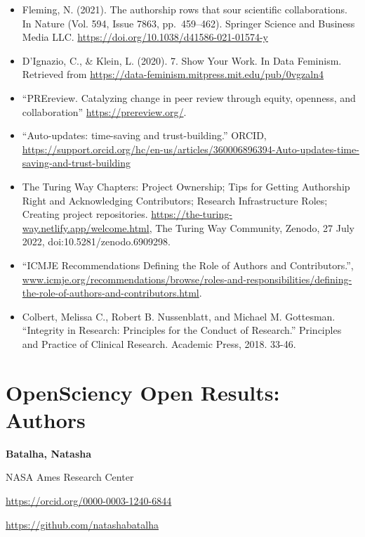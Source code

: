 \documentclass[
  letterpaper,
  DIV=11,
  numbers=noendperiod]{scrreport}
\providecommand{\tightlist}{%
  \setlength{\itemsep}{0pt}\setlength{\parskip}{0pt}}\usepackage{longtable,booktabs,array}
\begin{document}
\begin{itemize}
\tightlist
\item
  Fleming, N. (2021). The authorship rows that sour scientific
  collaborations. In Nature (Vol. 594, Issue 7863, pp.~459--462).
  Springer Science and Business Media LLC.
  \url{https://doi.org/10.1038/d41586-021-01574-y}
\item
  D'Ignazio, C., \& Klein, L. (2020). 7. Show Your Work. In Data
  Feminism. Retrieved from
  \url{https://data-feminism.mitpress.mit.edu/pub/0vgzaln4}
\item
  ``PREreview. Catalyzing change in peer review through equity,
  openness, and collaboration'' \url{https://prereview.org/}.
\item
  ``Auto-updates: time-saving and trust-building.'' ORCID,
  \url{https://support.orcid.org/hc/en-us/articles/360006896394-Auto-updates-time-saving-and-trust-building}
\item
  The Turing Way Chapters: Project Ownership; Tips for Getting
  Authorship Right and Acknowledging Contributors; Research
  Infrastructure Roles; Creating project repositories.
  \url{https://the-turing-way.netlify.app/welcome.html}, The Turing Way
  Community, Zenodo, 27 July 2022, doi:10.5281/zenodo.6909298.
\item
  ``ICMJE \textbar{} Recommendations \textbar{} Defining the Role of
  Authors and Contributors.'',
  \href{http://www.icmje.org/recommendations/browse/roles-and-responsibilities/defining-the-role-of-authors-and-contributors.html}{www.icmje.org/recommendations/browse/roles-and-responsibilities/defining-the-role-of-authors-and-contributors.html}.
\item
  Colbert, Melissa C., Robert B. Nussenblatt, and Michael M. Gottesman.
  ``Integrity in Research: Principles for the Conduct of Research.''
  Principles and Practice of Clinical Research. Academic Press, 2018.
  33-46.
\end{itemize}

\hypertarget{opensciency-open-results-authors}{%
\chapter{OpenSciency Open Results:
Authors}\label{opensciency-open-results-authors}}

\textbf{Batalha, Natasha}

NASA Ames Research Center

\url{https://orcid.org/0000-0003-1240-6844}

\url{https://github.com/natashabatalha}
\end{document}
